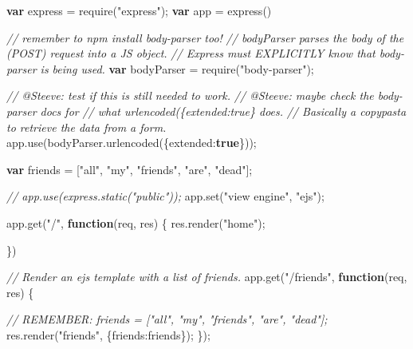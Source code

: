 \documentclass[11pt]{article}
\newenvironment{Shaded}{}{}
\newcommand{\KeywordTok}[1]{\textcolor[rgb]{0.00,0.44,0.13}{\textbf{{#1}}}}
\newcommand{\DataTypeTok}[1]{\textcolor[rgb]{0.56,0.13,0.00}{{#1}}}
\newcommand{\StringTok}[1]{\textcolor[rgb]{0.25,0.44,0.63}{{#1}}}
\newcommand{\CommentTok}[1]{\textcolor[rgb]{0.38,0.63,0.69}{\textit{{#1}}}}
\newcommand{\NormalTok}[1]{{#1}}
\newcommand{\VariableTok}[1]{\textcolor[rgb]{0.10,0.09,0.49}{{#1}}}
\newcommand{\OperatorTok}[1]{\textcolor[rgb]{0.40,0.40,0.40}{{#1}}}
\newcommand{\AttributeTok}[1]{\textcolor[rgb]{0.49,0.56,0.16}{{#1}}}
\begin{document}
\begin{Shaded}
\begin{Highlighting}[]
\KeywordTok{var}\NormalTok{ express }\OperatorTok{=} \AttributeTok{require}\NormalTok{(}\StringTok{"express"}\NormalTok{)}\OperatorTok{;}
\KeywordTok{var}\NormalTok{ app }\OperatorTok{=} \AttributeTok{express}\NormalTok{()}


\CommentTok{// remember to npm install body-parser too!}
\CommentTok{// bodyParser parses the body of the (POST) request into a JS object.}
\CommentTok{// Express must EXPLICITLY know that body-parser is being used.}
\KeywordTok{var}\NormalTok{ bodyParser }\OperatorTok{=} \AttributeTok{require}\NormalTok{(}\StringTok{"body-parser"}\NormalTok{)}\OperatorTok{;}

\CommentTok{// @Steeve: test if this is still needed to work.}
\CommentTok{// @Steeve: maybe check the body-parser docs for }
\CommentTok{//   what urlencoded(\{extended:true\} does.}
\CommentTok{// Basically a copypasta to retrieve the data from a form.}
\VariableTok{app}\NormalTok{.}\AttributeTok{use}\NormalTok{(}\VariableTok{bodyParser}\NormalTok{.}\AttributeTok{urlencoded}\NormalTok{(}\OperatorTok{\{}\DataTypeTok{extended}\OperatorTok{:}\KeywordTok{true}\OperatorTok{\}}\NormalTok{))}\OperatorTok{;}

\KeywordTok{var}\NormalTok{ friends  }\OperatorTok{=}\NormalTok{ [}\StringTok{"all"}\OperatorTok{,} \StringTok{"my"}\OperatorTok{,} \StringTok{"friends"}\OperatorTok{,} \StringTok{"are"}\OperatorTok{,} \StringTok{"dead"}\NormalTok{]}\OperatorTok{;}


\CommentTok{// app.use(express.static("public"));}
\VariableTok{app}\NormalTok{.}\AttributeTok{set}\NormalTok{(}\StringTok{"view engine"}\OperatorTok{,} \StringTok{"ejs"}\NormalTok{)}\OperatorTok{;}

\VariableTok{app}\NormalTok{.}\AttributeTok{get}\NormalTok{(}\StringTok{"/"}\OperatorTok{,} \KeywordTok{function}\NormalTok{(req}\OperatorTok{,}\NormalTok{ res) }\OperatorTok{\{}
  \VariableTok{res}\NormalTok{.}\AttributeTok{render}\NormalTok{(}\StringTok{"home"}\NormalTok{)}\OperatorTok{;}
  
\OperatorTok{\}}\NormalTok{)}

 
\CommentTok{// Render an ejs template with a list of friends.}
\VariableTok{app}\NormalTok{.}\AttributeTok{get}\NormalTok{(}\StringTok{"/friends"}\OperatorTok{,} \KeywordTok{function}\NormalTok{(req}\OperatorTok{,}\NormalTok{ res) }\OperatorTok{\{}
  
  \CommentTok{// REMEMBER: friends  = ["all", "my", "friends", "are", "dead"];}
  \VariableTok{res}\NormalTok{.}\AttributeTok{render}\NormalTok{(}\StringTok{"friends"}\OperatorTok{,} \OperatorTok{\{}\DataTypeTok{friends}\OperatorTok{:}\NormalTok{friends}\OperatorTok{\}}\NormalTok{)}\OperatorTok{;}
\OperatorTok{\}}\NormalTok{)}\OperatorTok{;}



\end{Highlighting}
\end{Shaded}
\end{document}
